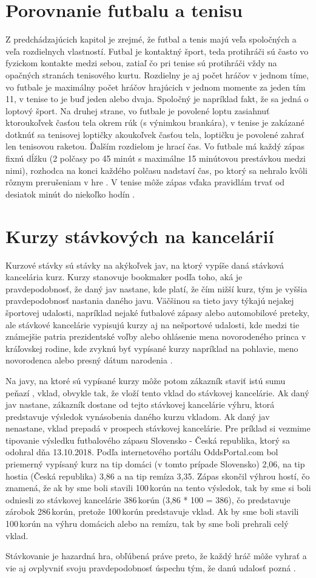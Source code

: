 \section{Porovnanie futbalu a tenisu}
Z predchádzajúcich kapitol je zrejmé, že futbal a tenis majú veľa spoločných a veľa rozdielnych vlastností. 
Futbal je kontaktný šport, teda protihráči sú často vo fyzickom kontakte medzi sebou, zatiaľ čo pri tenise sú protihráči vždy na opačných stranách tenisového kurtu. 
Rozdielny je aj počet hráčov v jednom tíme, vo futbale je maximálny počet hráčov hrajúcich v jednom momente za jeden tím 11, v tenise to je buď jeden alebo dvaja.
Spoločný je napríklad fakt, že sa jedná o loptový šport. 
Na druhej strane, vo futbale je povolené loptu zasiahnuť ktoroukoľvek časťou tela okrem rúk (s výnimkou brankára), v tenise je zakázané dotknúť sa tenisovej loptičky akoukoľvek časťou tela, loptičku je povolené zahrať len tenisovou raketou.
Ďalším rozdielom je hrací čas. Vo futbale má každý zápas fixnú dĺžku (2 polčasy po 45 minút s maximálne 15 minútovou prestávkou medzi nimi), rozhodca na konci každého polčasu nadstaví čas, po ktorý sa nehralo kvôli rôznym prerušeniam v hre 
\citep{hry1}.
V tenise môže zápas vďaka pravidlám trvať od desiatok minút do niekoľko hodín \citep{tenis:kor}.


\section{Kurzy stávkových na kancelárií}
Kurzové stávky sú stávky na akýkoľvek jav, na ktorý vypíše daná stávková kancelária kurz. 
Kurzy stanovuje bookmaker podľa toho, aká je pravdepodobnosť, že daný jav nastane, kde platí, že čím nižší kurz, tým je vyššia pravdepodobnosť nastania daného javu. 
Väčšinou sa tieto javy týkajú nejakej športovej udalosti, napríklad nejaké futbalové zápasy alebo automobilové preteky, ale stávkové kancelárie vypisujú kurzy aj na nešportové udalosti, kde medzi tie známejšie patria prezidentské voľby \citep{bet:pres} alebo ohlásenie mena novorodeného princa v kráľovskej rodine, kde zvyknú byť vypísané kurzy napríklad na pohlavie, meno novorodenca alebo presný dátum narodenia \citep{bet:prince}.

Na javy, na ktoré sú vypísané kurzy môže potom zákazník staviť istú sumu peňazí , vklad, obvykle tak, že vloží tento vklad do stávkovej kancelárie. 
Ak daný jav nastane, zákazník dostane od tejto stávkovej kancelárie výhru, ktorá predstavuje výsledok vynásobenia daného kurzu vkladom.
Ak daný jav nenastane, vklad prepadá v prospech stávkovej kancelárie.
Pre príklad si vezmime tipovanie výsledku futbalového zápasu Slovensko - Česká republika, ktorý sa odohral dňa 13.10.2018. 
Podľa internetového portálu OddsPortal.com bol priemerný vypísaný kurz na tip domáci (v tomto prípade Slovensko) 2,06, na tip hostia (Česká republika) 3,86 a na tip remíza 3,35.
Zápas skončil výhrou hostí, čo znamená, že ak by sme boli stavili 100\,\rm korún na tento výsledok, tak by sme si boli odniesli zo stávkovej kancelárie 386\,\rm korún  (3,86 * 100 = 386), čo predstavuje zárobok 286\,\rm korún, pretože 100\,\rm korún predstavuje vklad.
Ak by sme boli stavili 100\,\rm korún na výhru domácich alebo na remízu, tak by sme boli prehrali celý vklad.

Stávkovanie je hazardná hra, obľúbená práve preto, že každý hráč môže vyhrať a vie aj ovplyvniť svoju pravdepodobnosť úspechu tým, že danú udalosť pozná \citep{odds}.







